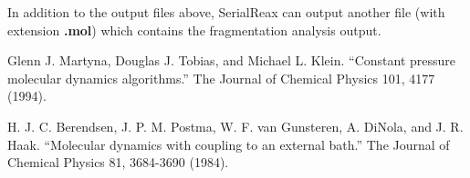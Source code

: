 \documentclass{article}
\begin{document}
In addition to the output files above, SerialReax can output another
file (with extension \textbf{.mol}) which contains the fragmentation 
analysis output.


\begin{thebibliography}{99}
    Glenn J. Martyna, Douglas J. Tobias, and Michael L. Klein. 
    ``Constant pressure molecular dynamics algorithms.'' 
    The Journal of Chemical Physics 101, 4177 (1994).

    H. J. C. Berendsen, J. P. M. Postma, W. F. van Gunsteren, A. DiNola, and 
    J. R. Haak.
    ``Molecular dynamics with coupling to an external bath.''
    The Journal of Chemical Physics 81, 3684-3690 (1984).

\end{thebibliography}
\end{document}

